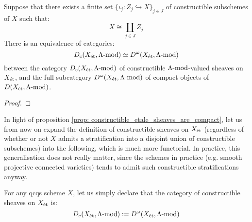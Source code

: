         \begin{proposition} \label{prop: constructible_etale_sheaves_are_compact}
            Suppose that there exists a finite set $\{\iota_j: Z_j \hookrightarrow X\}_{j \in J}$ of constructible subschemes of $X$ such that:
                $$X \cong \coprod_{j \in J} Z_j$$
            There is an equivalence of categories:
                $$D_{\cons}(X_{\et}, \Lambda\mod) \cong D^{\omega}(X_{\et}, \Lambda\mod)$$
            between the category $D_{\cons}(X_{\et}, \Lambda\mod)$ of constructible $\Lambda\mod$-valued sheaves on $X_{\et}$, and the full subcategory $D^{\omega}(X_{\et}, \Lambda\mod)$ of compact objects of $D(X_{\et}, \Lambda\mod)$.
        \end{proposition}
            \begin{proof}
                
            \end{proof}

        In light of proposition \ref{prop: constructible_etale_sheaves_are_compact}, let us from now on expand the definition of constructible sheaves on $X_{\et}$ (regardless of whether or not $X$ admits a stratification into a disjoint union of constructible subschemes) into the following, which is much more functorial. In practice, this generalisation does not really matter, since the schemes in practice (e.g. smooth projective connected varieties) tends to admit such constructible stratifications anyway.
        \begin{definition} \label{def: constructible_etale_sheaves}
            For any qcqs scheme $X$, let us simply declare that the category of constructible sheaves on $X_{\et}$ is:
                $$D_{\cons}(X_{\et}, \Lambda\mod) := D^{\omega}(X_{\et}, \Lambda\mod)$$
        \end{definition}
        \begin{lemma}
            
        \end{lemma}

        \begin{theorem}
            
        \end{theorem}

